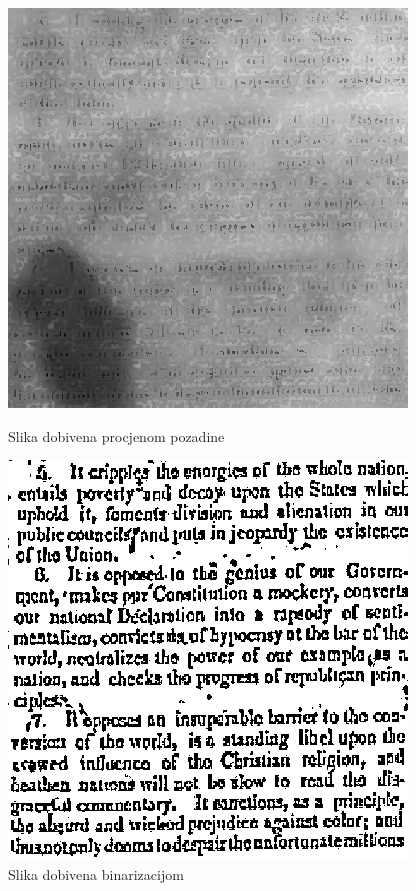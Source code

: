 \documentclass[times, utf8, zavrsni, numeric]{fer}
\begin{document}
\begin{figure}[!ht]
\centering
\begin{minipage}{.5\textwidth}
    \centering
    \includegraphics[width=.85\linewidth]{Images/Background.png}
    \caption{Slika dobivena procjenom pozadine}
    \label{fig:background}
\end{minipage}%
\begin{minipage}{.5\textwidth}
    \centering
    \includegraphics[width=.85\linewidth]{Images/FinalThreshold.png}
    \captionsetup{justification=centering}
    \caption{Slika dobivena binarizacijom}
    \label{fig:finalThreshold}
\end{minipage}
\end{figure}
\end{document}
